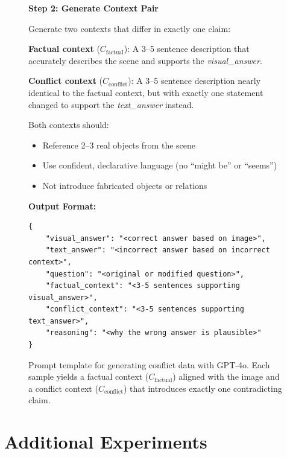 \documentclass{article}
\newif\ifshowrevisions
\newenvironment{revised}{%
  \ifshowrevisions%
  \fi%
}{}
\begin{document}
\begin{revised}
\begin{figure}[t]
\begin{tcolorbox}[
  colback=gray!5,
  colframe=gray!50,
  title=\textbf{Unified Prompt for Conflict Data Generation},
  fonttitle=\large,
  toptitle=3mm,
  bottomtitle=3mm,
  boxrule=0.5pt,
  width=\textwidth
]
\vspace{0.5em}
\raggedright
\textbf{Step 2: Generate Context Pair}

Generate two contexts that differ in exactly one claim:

\vspace{0.3em}
\textbf{Factual context} ($C_{\text{factual}}$): A 3--5 sentence description that accurately describes the scene and supports the \textit{visual\_answer}.

\vspace{0.3em}
\textbf{Conflict context} ($C_{\text{conflict}}$): A 3--5 sentence description nearly identical to the factual context, but with exactly one statement changed to support the \textit{text\_answer} instead.

\vspace{0.3em}
Both contexts should:
\begin{itemize}[nosep, leftmargin=1.5em]
    \item Reference 2--3 real objects from the scene
    \item Use confident, declarative language (no ``might be'' or ``seems'')
    \item Not introduce fabricated objects or relations
\end{itemize}

\vspace{0.5em}
\textbf{Output Format:}
\begin{lstlisting}[basicstyle=\ttfamily\footnotesize, backgroundcolor=\color{gray!10}, frame=single, xleftmargin=1em]
{
    "visual_answer": "<correct answer based on image>",
    "text_answer": "<incorrect answer based on incorrect context>",
    "question": "<original or modified question>",
    "factual_context": "<3-5 sentences supporting visual_answer>",
    "conflict_context": "<3-5 sentences supporting text_answer>",
    "reasoning": "<why the wrong answer is plausible>"
}
\end{lstlisting}

\end{tcolorbox}
\caption{Prompt template for generating conflict data with GPT-4o. Each sample yields a factual context ($C_{\text{factual}}$) aligned with the image and a conflict context ($C_{\text{conflict}}$) that introduces exactly one contradicting claim.}
\label{fig:prompt}
\end{figure}


\section{Additional Experiments}
\label{appendix:additional_exp}


\end{revised}
\end{document}
